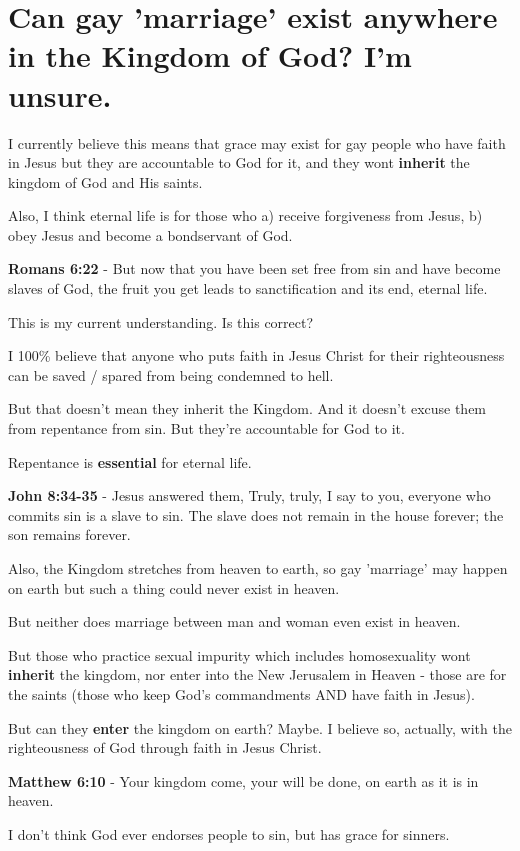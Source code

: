 \documentclass[11pt]{article}
\begin{document}
\section{Can gay 'marriage' exist anywhere in the Kingdom of God? I'm unsure.}
\label{sec:org6d5eb10}
I currently believe this means that grace may
exist for gay people who have faith in Jesus
but they are accountable to God for it, and
they wont \textbf{inherit} the kingdom of God and His saints.

Also, I think eternal life is for those who a) receive forgiveness from Jesus, b) obey Jesus and become a bondservant of God.

\textbf{Romans 6:22} - But now that you have been set free from sin and have become slaves of God, the fruit you get leads to sanctification and its end, eternal life.

This is my current understanding. Is this correct?

I 100\% believe that anyone who puts faith in Jesus Christ for their righteousness can be saved / spared from being condemned to hell.

But that doesn't mean they inherit the Kingdom.
And it doesn't excuse them from repentance from sin.
But they're accountable for God to it.

Repentance is \textbf{essential} for eternal life.

\textbf{John 8:34-35} - Jesus answered them, Truly, truly, I say to you, everyone who commits sin is a slave to sin. The slave does not remain in the house forever; the son remains forever.

Also, the Kingdom stretches from heaven to earth, so gay 'marriage' may happen on earth but such a thing could never exist in heaven.

But neither does marriage between man and woman even exist in heaven.

But those who practice sexual impurity which includes homosexuality wont \textbf{inherit} the kingdom, nor enter into the New Jerusalem in Heaven - those are for the saints (those who keep God's commandments AND have faith in Jesus).

But can they \textbf{enter} the kingdom on earth? Maybe. I believe so, actually, with the righteousness of God through faith in Jesus Christ.

\textbf{Matthew 6:10} - Your kingdom come, your will be done, on earth as it is in heaven.

I don't think God ever endorses people to sin, but has grace for sinners.
\end{document}
